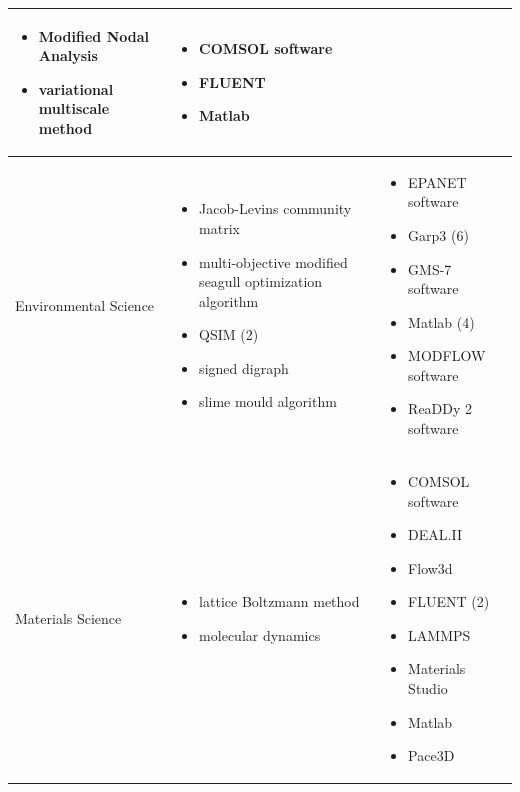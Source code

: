 \documentclass[utf8]{gradu3}
\begin{document}
\begin{longtable}[h]{|p{4cm}|p{6cm}|p{5cm}|}
\begin{itemize}
        \item Modified Nodal Analysis
        \item variational multiscale method
    \end{itemize} &
    \begin{itemize}
        \item COMSOL software 
        \item FLUENT
        \item Matlab
    \end{itemize}
    \\
    \hline
    Environmental Science & \begin{itemize}
        \item Jacob-Levins community matrix
        \item multi-objective modified seagull optimization algorithm
        \item QSIM (2)
        \item signed digraph
        \item slime mould algorithm
    \end{itemize} &
    \begin{itemize}
        \item EPANET software
        \item Garp3 (6)
        \item GMS-7 software
        \item Matlab (4)
        \item MODFLOW software
        \item ReaDDy 2 software
    \end{itemize}
    \\
    \hline
    Materials Science & \begin{itemize}
        \item lattice Boltzmann method
        \item molecular dynamics
    \end{itemize} & 
    \begin{itemize}
        \item COMSOL software 
        \item DEAL.II
        \item Flow3d
        \item FLUENT (2)
        \item LAMMPS
        \item Materials Studio
        \item Matlab
        \item Pace3D 
    \end{itemize}

\end{longtable}
\end{document}
